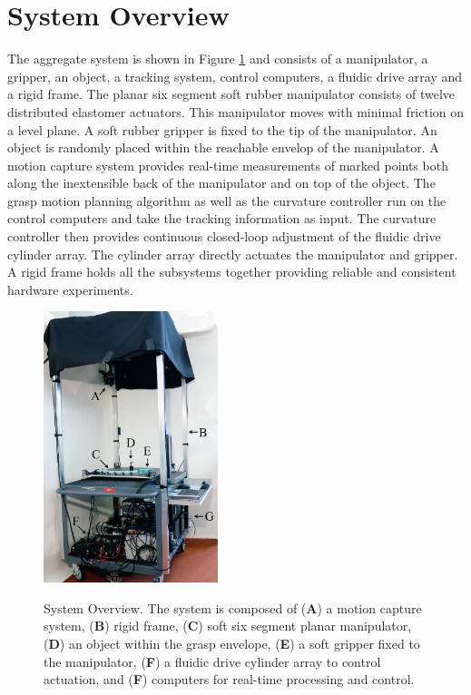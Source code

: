 \section{System Overview}
\label{sec:System_Overview}
The aggregate system is shown in Figure \ref{fig:sys_overview} and consists of a manipulator, a gripper, an object, a tracking system, control computers, a fluidic drive array and a rigid frame.
The planar six segment soft rubber manipulator consists of twelve distributed elastomer actuators. This manipulator moves with minimal friction on a level plane.
A soft rubber gripper is fixed to the tip of the manipulator.
An object is randomly placed within the reachable envelop of the manipulator. 
A motion capture system provides real-time measurements of marked points both along the inextensible back of the manipulator and on top of the object. 
The grasp motion planning algorithm as well as the curvature controller run on the control computers and take the tracking information as input.
The curvature controller then provides continuous closed-loop adjustment of the fluidic drive cylinder array.
The cylinder array directly actuates the manipulator and gripper.
A rigid frame holds all the subsystems together providing reliable and consistent hardware experiments. 

\begin{figure}[htbp]
\begin{centering}
  \includegraphics[width=2.0in]{Figures/system_overview/sys_overview_smaller}\\
  \caption{System Overview. The system is composed of (\textbf{A}) a motion capture system, (\textbf{B}) rigid frame, (\textbf{C}) soft six segment planar manipulator, (\textbf{D}) an object within the grasp envelope, (\textbf{E}) a soft gripper fixed to the manipulator, (\textbf{F}) a fluidic drive cylinder array to control actuation, and (\textbf{F}) computers for real-time processing and control.} \label{fig:sys_overview}
\end{centering}
\end{figure}
